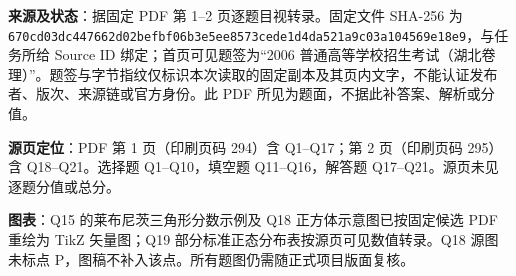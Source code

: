 

\begin{gktip}
\textbf{来源及状态}：据固定 PDF 第 1–2 页逐题目视转录。固定文件 SHA-256 为 \texttt{670cd03dc447662d02befbf06b3e5ee8573cede1d4da521a9c03a104569e18e9}，与任务所给 Source ID 绑定；首页可见题签为“2006 普通高等学校招生考试（湖北卷理）”。题签与字节指纹仅标识本次读取的固定副本及其页内文字，不能认证发布者、版次、来源链或官方身份。此 PDF 所见为题面，不据此补答案、解析或分值。

\textbf{源页定位}：PDF 第 1 页（印刷页码 294）含 Q1–Q17；第 2 页（印刷页码 295）含 Q18–Q21。选择题 Q1–Q10，填空题 Q11–Q16，解答题 Q17–Q21。源页未见逐题分值或总分。

\textbf{图表}：Q15 的莱布尼茨三角形分数示例及 Q18 正方体示意图已按固定候选 PDF 重绘为 TikZ 矢量图；Q19 部分标准正态分布表按源页可见数值转录。Q18 源图未标点 P，图稿不补入该点。所有题图仍需随正式项目版面复核。
\end{gktip}


